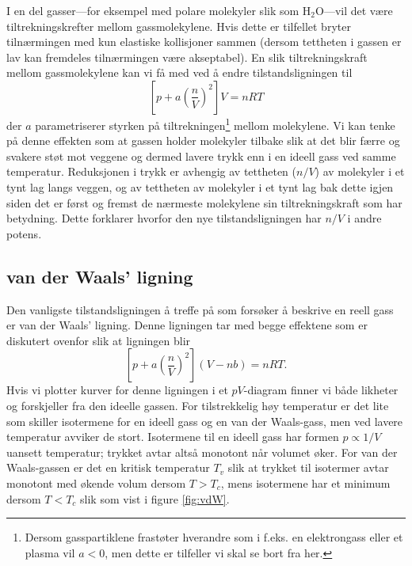 I en del gasser---for eksempel med polare molekyler slik som H$_2$O---vil det være tiltrekningskrefter mellom gassmolekylene. Hvis dette er tilfellet bryter tilnærmingen med kun elastiske kollisjoner sammen (dersom tettheten i gassen er lav kan fremdeles tilnærmingen være akseptabel). En slik tiltrekningskraft mellom gassmolekylene kan vi få med ved å endre tilstandsligningen til
\begin{displaymath}
	\left[p + a\left(\frac{n}{V}\right)^2\right]V = nRT
\end{displaymath}
der $a$ parametriserer styrken på tiltrekningen\footnote{Dersom gasspartiklene frastøter hverandre som i f.eks. en elektrongass eller et plasma vil $a<0$, men dette er tilfeller vi skal se bort fra her.} mellom molekylene. Vi kan tenke på denne effekten som at gassen holder molekyler tilbake slik at det blir færre og svakere støt mot veggene og dermed lavere trykk enn i en ideell gass ved samme temperatur. Reduksjonen i trykk er avhengig av tettheten ($n/V$) av molekyler i et tynt lag langs veggen, og av tettheten av molekyler i et tynt lag bak dette igjen siden det er først og fremst de nærmeste molekylene sin tiltrekningskraft som har betydning. Dette forklarer hvorfor den nye tilstandsligningen har $n/V$ i andre potens.

\subsection{van der Waals' ligning}
Den vanligste tilstandsligningen å treffe på som forsøker å beskrive en reell gass er van der Waals' ligning. Denne ligningen tar med begge effektene som er diskutert ovenfor slik at ligningen blir
\begin{displaymath}
	\left[p + a\left(\frac{n}{V}\right)^2\right](V - nb) = nRT. 
\end{displaymath}
Hvis vi plotter kurver for denne ligningen i et $pV$-diagram finner vi både likheter og forskjeller fra den ideelle gassen. For tilstrekkelig høy temperatur er det lite som skiller isotermene for en ideell gass og en van der Waals-gass, men ved lavere temperatur avviker de stort. Isotermene til en ideell gass har formen $p\propto 1/V$ uansett temperatur; trykket avtar altså monotont når volumet øker. For van der Waals-gassen er det en kritisk temperatur $T_v$ slik at trykket til isotermer avtar monotont med økende volum dersom $T>T_c$, mens isotermene har et minimum dersom $T<T_c$ slik som vist i figure \ref{fig:vdW}.

